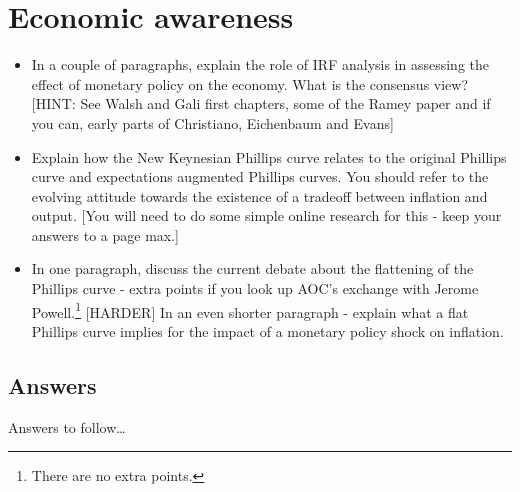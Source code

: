 \documentclass[authoryear,11pt]{elsarticle}
\begin{document}
\section{Economic awareness}
\begin{itemize}
\item	In a couple of paragraphs, explain the role of IRF analysis in assessing the effect of monetary policy on the economy. What is the consensus view? [HINT: See Walsh and Gali first chapters, some of the Ramey paper and if you can, early parts of Christiano, Eichenbaum and Evans]
\item	Explain how the New Keynesian Phillips curve relates to the original Phillips curve and expectations augmented Phillips curves. You should refer to the evolving attitude towards the existence of a tradeoff between inflation and output. [You will need to do some simple online research for this - keep your answers to a page max.] 
\item	In one paragraph, discuss the current debate about the flattening of the Phillips curve - extra points if you look up AOC's exchange with Jerome Powell.\footnote{There are no extra points.} [HARDER] In an even shorter paragraph - explain what a flat Phillips curve implies for the impact of a monetary policy shock on inflation.
\end{itemize}

\subsection*{Answers}
Answers to follow\ldots
\end{document}
